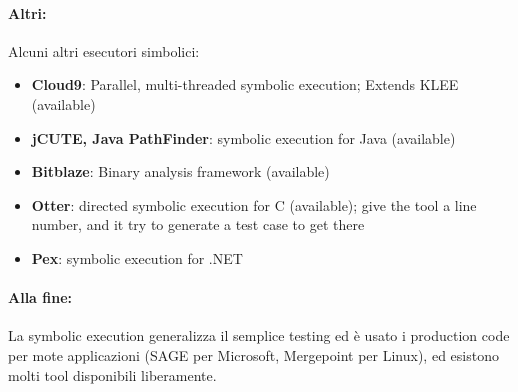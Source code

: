 \paragraph{Altri:} Alcuni altri esecutori simbolici: 
\begin{itemize}
	\item \textbf{Cloud9}: Parallel, multi-threaded symbolic execution; Extends KLEE (available)
	\item \textbf{jCUTE, Java PathFinder}: symbolic execution for Java (available)
	\item \textbf{Bitblaze}: Binary analysis framework (available)
	\item \textbf{Otter}: directed symbolic execution for C (available); give the tool a line number, and it try to generate a test case to get there
	\item \textbf{Pex}: symbolic execution for .NET
\end{itemize}

\paragraph{Alla fine:} La symbolic execution generalizza il semplice testing ed è usato i production code per mote applicazioni (SAGE per Microsoft, Mergepoint per Linux), ed esistono molti tool disponibili liberamente.\\